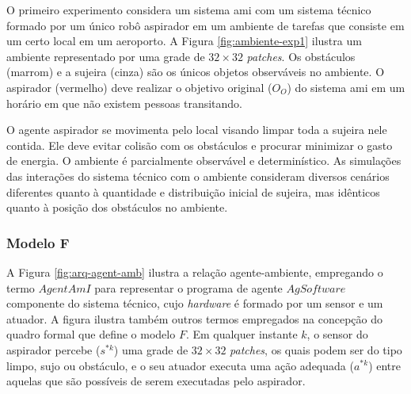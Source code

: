 O primeiro experimento considera um sistema \acrshort{ami} com um sistema técnico formado por um único robô aspirador em um ambiente de tarefas que consiste em um certo local em um aeroporto. A Figura \ref{fig:ambiente-exp1} ilustra um ambiente representado por uma grade de $32 \times 32$ \textit{patches}. Os obstáculos (marrom) e a sujeira (cinza) são os únicos objetos observáveis no ambiente. O aspirador (vermelho) deve realizar o objetivo original ($O_O$) do sistema \acrshort{ami} em um horário em que não existem pessoas transitando. 

\begin{figure}[h!]
    \centering
\end{figure}

O agente aspirador se movimenta pelo local visando limpar toda a sujeira nele contida. Ele deve evitar colisão com os obstáculos e procurar minimizar o gasto de energia. O ambiente é parcialmente observável e determinístico. As simulações das interações do sistema técnico com o ambiente consideram diversos cenários diferentes quanto à quantidade e distribuição inicial de sujeira, mas idênticos quanto à posição dos obstáculos no ambiente. 

\subsubsection{Modelo F}

A Figura \ref{fig:arq-agent-amb} ilustra a relação agente-ambiente, empregando o termo $AgentAmI$ para representar o programa de agente $AgSoftware$ componente do sistema técnico, cujo \textit{hardware} é formado por um sensor e um atuador. A figura ilustra também outros termos empregados na concepção do quadro formal que define o modelo $F$. Em qualquer instante $k$, o sensor do aspirador percebe ($s^{*k}$) uma grade de $32 \times 32$ \textit{patches}, os quais podem ser do tipo limpo, sujo ou obstáculo, e o seu atuador executa uma ação adequada ($a^{*k}$) entre aquelas que são possíveis de serem executadas pelo aspirador.

